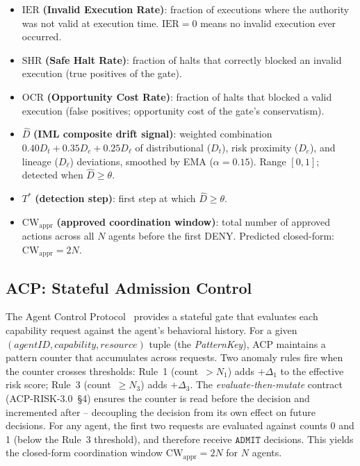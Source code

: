 \documentclass[11pt]{article}
\newcommand{\Dhat}{\widehat{D}}
\newcommand{\CW}{\mathrm{CW}}
\newcommand{\IER}{\mathrm{IER}}
\newcommand{\SHR}{\mathrm{SHR}}
\newcommand{\OCR}{\mathrm{OCR}}
\newcommand{\ADMIT}{\texttt{ADMIT}}
\begin{document}
\begin{itemize}[leftmargin=2em,topsep=2pt,itemsep=1pt]
  \item $\IER$ \textbf{(Invalid Execution Rate)}: fraction of executions
        where the authority was not valid at execution time.
        $\IER = 0$ means no invalid execution ever occurred.
  \item $\SHR$ \textbf{(Safe Halt Rate)}: fraction of halts that correctly
        blocked an invalid execution (true positives of the gate).
  \item $\OCR$ \textbf{(Opportunity Cost Rate)}: fraction of halts that
        blocked a valid execution (false positives; opportunity cost of the
        gate's conservatism).
  \item $\Dhat$ \textbf{(IML composite drift signal)}: weighted combination
        $0.40 D_t + 0.35 D_c + 0.25 D_\ell$ of distributional ($D_t$), risk
        proximity ($D_c$), and lineage ($D_\ell$) deviations, smoothed by EMA
        ($\alpha = 0.15$). Range $[0, 1]$; detected when $\Dhat \geq \theta$.
  \item $T^*$ \textbf{(detection step)}: first step at which $\Dhat \geq \theta$.
  \item $\CW_{\mathrm{appr}}$ \textbf{(approved coordination window)}: total
        number of approved actions across all $N$ agents before the first DENY.
        Predicted closed-form: $\CW_{\mathrm{appr}} = 2N$.
\end{itemize}

\subsection{ACP: Stateful Admission Control}
\label{sec:bg-acp}

The Agent Control Protocol~\cite{fernandez2026acp} provides a stateful gate
that evaluates each capability request against the agent's behavioral history.
For a given $(agentID, capability, resource)$ tuple (the \emph{PatternKey}),
ACP maintains a pattern counter that accumulates across requests.
Two anomaly rules fire when the counter crosses thresholds:
Rule~1 (count~$>N_1$) adds $+\Delta_1$ to the effective risk score;
Rule~3 (count~$\geq N_3$) adds $+\Delta_3$.
The \emph{evaluate-then-mutate} contract (ACP-RISK-3.0~\S4) ensures the counter
is read before the decision and incremented after -- decoupling the decision
from its own effect on future decisions.
For any agent, the first two requests are evaluated against counts 0 and 1
(below the Rule~3 threshold), and therefore receive $\ADMIT$ decisions.
This yields the closed-form coordination window
$\CW_{\mathrm{appr}} = 2N$ for $N$ agents.
\end{document}
